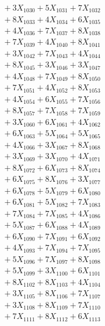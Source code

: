 \documentclass[a4paper,10pt]{article}
\begin{document}
{\begin{align}
&\;  + 3 X_{1030} + 5 X_{1031} + 7 X_{1032} \\[0.3ex]
&\;  + 8 X_{1033} + 4 X_{1034} + 6 X_{1035} \\[0.3ex]
&\;  + 4 X_{1036} + 7 X_{1037} + 8 X_{1038} \\[0.3ex]
&\;  + 7 X_{1039} + 4 X_{1040} + 8 X_{1041} \\[0.3ex]
&\;  + 3 X_{1042} + 7 X_{1043} + 4 X_{1044} \\[0.3ex]
&\;  + 8 X_{1045} + 3 X_{1046} + 3 X_{1047} \\[0.3ex]
&\;  + 4 X_{1048} + 7 X_{1049} + 8 X_{1050} \\[0.3ex]
&\;  + 7 X_{1051} + 4 X_{1052} + 8 X_{1053} \\[0.3ex]
&\;  + 4 X_{1054} + 6 X_{1055} + 7 X_{1056} \\[0.3ex]
&\;  + 8 X_{1057} + 7 X_{1058} + 7 X_{1059} \\[0.5ex]\allowbreak
&\;  + 3 X_{1060} + 6 X_{1061} + 4 X_{1062} \\[0.3ex]
&\;  + 6 X_{1063} + 5 X_{1064} + 5 X_{1065} \\[0.3ex]
&\;  + 4 X_{1066} + 3 X_{1067} + 8 X_{1068} \\[0.3ex]
&\;  + 3 X_{1069} + 3 X_{1070} + 4 X_{1071} \\[0.3ex]
&\;  + 8 X_{1072} + 6 X_{1073} + 8 X_{1074} \\[0.3ex]
&\;  + 6 X_{1075} + 8 X_{1076} + 3 X_{1077} \\[0.3ex]
&\;  + 6 X_{1078} + 5 X_{1079} + 6 X_{1080} \\[0.3ex]
&\;  + 6 X_{1081} + 5 X_{1082} + 7 X_{1083} \\[0.3ex]
&\;  + 7 X_{1084} + 7 X_{1085} + 4 X_{1086} \\[0.3ex]
&\;  + 5 X_{1087} + 6 X_{1088} + 4 X_{1089} \\[0.5ex]\allowbreak
&\;  + 6 X_{1090} + 7 X_{1091} + 6 X_{1092} \\[0.3ex]
&\;  + 4 X_{1093} + 7 X_{1094} + 7 X_{1095} \\[0.3ex]
&\;  + 5 X_{1096} + 7 X_{1097} + 8 X_{1098} \\[0.3ex]
&\;  + 5 X_{1099} + 3 X_{1100} + 6 X_{1101} \\[0.3ex]
&\;  + 8 X_{1102} + 8 X_{1103} + 4 X_{1104} \\[0.3ex]
&\;  + 3 X_{1105} + 8 X_{1106} + 7 X_{1107} \\[0.3ex]
&\;  + 3 X_{1108} + 8 X_{1109} + 7 X_{1110} \\[0.3ex]
&\;  + 7 X_{1111} + 8 X_{1112} + 6 X_{1113} \\[0.3ex]

\end{align}}
\end{document}
